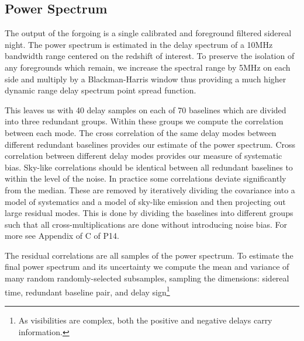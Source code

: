 \documentclass[preprint]{aastex}
\begin{document}
\subsection{Power Spectrum}
\label{sec:power_spectrum}
The output of the forgoing is a single calibrated and foreground filtered sidereal night. The power spectrum is estimated in the delay spectrum of  a 10MHz bandwidth range centered on the redshift of interest. To preserve the isolation of any foregrounds which remain, we increase the spectral range by 5MHz on each side and multiply by a Blackman-Harris window thus providing a much higher dynamic range delay spectrum point spread function. 

This leaves us with 40 delay samples on each of 70 baselines which are divided into three redundant groups. Within these groups we compute the  correlation between each mode.  The cross correlation of the same delay modes between different redundant baselines provides our estimate of the power spectrum.  Cross correlation between different delay modes provides our measure of systematic bias.  Sky-like correlations should be identical between all redundant baselines to within the level of the noise. In practice some correlations deviate significantly from the median.  These are removed by iteratively dividing the covariance into a model of systematics and a model of sky-like emission and then projecting out large residual modes. This is done by dividing the baselines into different groups such that all cross-multiplications are done without introducing noise bias.  For more see Appendix of C of P14.

The residual correlations are all samples of the power spectrum. To estimate the final power spectrum and its uncertainty we compute the mean and variance of many random randomly-selected subsamples, sampling the dimensions: sidereal time, redundant baseline pair, and delay sign\footnote{As visibilities are complex, both the positive and negative delays  carry  information.}
\end{document}

